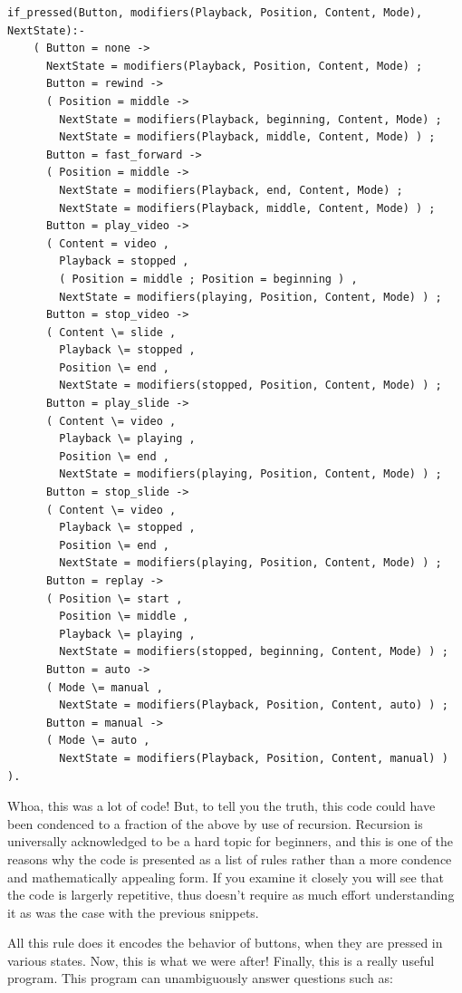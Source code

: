 \documentclass[11pt]{article}
\begin{document}
\begin{verbatim}
if_pressed(Button, modifiers(Playback, Position, Content, Mode), NextState):-
    ( Button = none ->
      NextState = modifiers(Playback, Position, Content, Mode) ;
      Button = rewind ->
      ( Position = middle ->
        NextState = modifiers(Playback, beginning, Content, Mode) ;
        NextState = modifiers(Playback, middle, Content, Mode) ) ;
      Button = fast_forward ->
      ( Position = middle ->
        NextState = modifiers(Playback, end, Content, Mode) ;
        NextState = modifiers(Playback, middle, Content, Mode) ) ;
      Button = play_video ->
      ( Content = video ,
        Playback = stopped ,
        ( Position = middle ; Position = beginning ) ,
        NextState = modifiers(playing, Position, Content, Mode) ) ;
      Button = stop_video ->
      ( Content \= slide ,
        Playback \= stopped ,
        Position \= end ,
        NextState = modifiers(stopped, Position, Content, Mode) ) ;
      Button = play_slide ->
      ( Content \= video ,
        Playback \= playing ,
        Position \= end ,
        NextState = modifiers(playing, Position, Content, Mode) ) ;
      Button = stop_slide ->
      ( Content \= video ,
        Playback \= stopped ,
        Position \= end ,
        NextState = modifiers(playing, Position, Content, Mode) ) ;
      Button = replay ->
      ( Position \= start ,
        Position \= middle ,
        Playback \= playing ,
        NextState = modifiers(stopped, beginning, Content, Mode) ) ;
      Button = auto ->
      ( Mode \= manual ,
        NextState = modifiers(Playback, Position, Content, auto) ) ;
      Button = manual ->
      ( Mode \= auto ,
        NextState = modifiers(Playback, Position, Content, manual) ) ).
\end{verbatim}

Whoa, this was a lot of code! But, to tell you the truth, this code could have
been condenced to a fraction of the above by use of recursion.  Recursion is
universally acknowledged to be a hard topic for beginners, and this is one of
the reasons why the code is presented as a list of rules rather than a more
condence and mathematically appealing form.  If you examine it closely you will
see that the code is largerly repetitive, thus doesn't require as much effort
understanding it as was the case with the previous snippets.

All this rule does it encodes the behavior of buttons, when they are pressed in
various states.  Now, this is what we were after!  Finally, this is a really
useful program.  This program can unambiguously answer questions such as:
\end{document}
